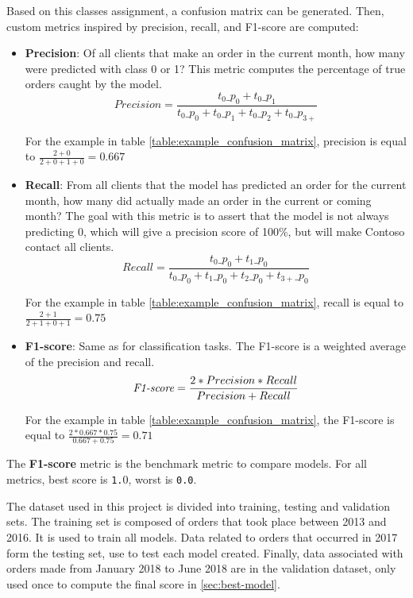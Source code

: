 Based on this classes assignment, a confusion matrix can be generated. Then, custom metrics inspired by precision, recall, and F1-score are computed:
\begin{itemize}
    \item \textbf{Precision}: Of all clients that make an order in the current month, how many were predicted with class 0 or 1? This metric computes the percentage of true orders caught by the model. 
    $$ Precision = \frac{t_0\_p_0 + t_0\_p_1}{t_0\_p_0 + t_0\_p_1 + t_0\_p_2 + t_0\_p_{3+}} $$
    
    For the example in table \ref{table:example_confusion_matrix}, precision is equal to $\frac{2+0}{2+0+1+0} = 0.667$
    
    \item \textbf{Recall}: From all clients that the model has predicted an order for the current month, how many did actually made an order in the current or coming month? The goal with this metric is to assert that the model is not always predicting 0, which will give a precision score of 100\%, but will make Contoso contact all clients. 
    $$ Recall = \frac{t_0\_p_0 + t_1\_p_0}{t_0\_p_0 + t_1\_p_0 + t_2\_p_0 + t_{3+}\_p_0} $$
    
    For the example in table \ref{table:example_confusion_matrix}, recall is equal to $\frac{2+1}{2+1+0+1} = 0.75$
    
    \item \textbf{F1-score}: Same as for classification tasks. The F1-score is a weighted average of the precision and recall.
    $$ \operatorname{\textit{F1-score}} = \frac{2*Precision*Recall}{Precision+Recall} $$

    For the example in table \ref{table:example_confusion_matrix}, the F1-score is equal to $\frac{2*0.667*0.75}{0.667+0.75} = 0.71$
\end{itemize}



The \textbf{F1-score} metric is the benchmark metric to compare models. For all metrics, best score is \texttt{1.}0, worst is \texttt{0.0}.

The dataset used in this project is divided into training, testing and validation sets. The training set is composed of orders that took place between 2013 and 2016. It is used to train all models. Data related to orders that occurred in 2017 form the testing set, use to test each model created. Finally, data associated with orders made from January 2018 to June 2018 are in the validation dataset, only used once to compute the final score in \ref{sec:best-model}.

